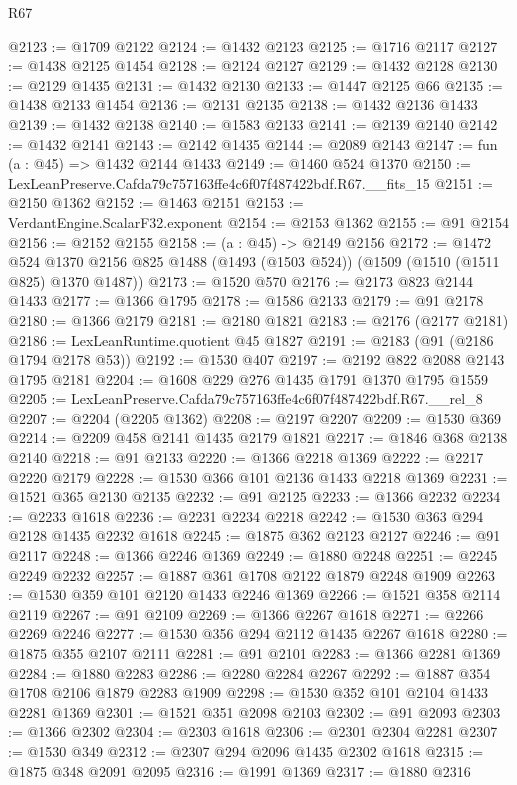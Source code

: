 \begin{lexlean}{R67}
\begin{coremodule}
@2123 := @1709 @2122
@2124 := @1432 @2123
@2125 := @1716 @2117
@2127 := @1438 @2125 @1454
@2128 := @2124 @2127
@2129 := @1432 @2128
@2130 := @2129 @1435
@2131 := @1432 @2130
@2133 := @1447 @2125 @66
@2135 := @1438 @2133 @1454
@2136 := @2131 @2135
@2138 := @1432 @2136 @1433
@2139 := @1432 @2138
@2140 := @1583 @2133
@2141 := @2139 @2140
@2142 := @1432 @2141
@2143 := @2142 @1435
@2144 := @2089 @2143
@2147 := fun (a : @45) => @1432 @2144 @1433
@2149 := @1460 @524 @1370
@2150 := LexLeanPreserve.Cafda79c757163ffe4c6f07f487422bdf.R67.__fits_15
@2151 := @2150 @1362
@2152 := @1463 @2151
@2153 := VerdantEngine.ScalarF32.exponent
@2154 := @2153 @1362
@2155 := @91 @2154
@2156 := @2152 @2155
@2158 := (a : @45) -> @2149 @2156
@2172 := @1472
    @524
    @1370
    @2156
    @825
    @1488
    (@1493 (@1503 @524))
    (@1509 (@1510 (@1511 @825) @1370 @1487))
@2173 := @1520 @570
@2176 := @2173 @823 @2144 @1433
@2177 := @1366 @1795
@2178 := @1586 @2133
@2179 := @91 @2178
@2180 := @1366 @2179
@2181 := @2180 @1821
@2183 := @2176 (@2177 @2181)
@2186 := LexLeanRuntime.quotient @45 @1827
@2191 := @2183 (@91 (@2186 @1794 @2178 @53))
@2192 := @1530 @407
@2197 := @2192 @822 @2088 @2143 @1795 @2181
@2204 := @1608 @229 @276 @1435 @1791 @1370 @1795 @1559
@2205 := LexLeanPreserve.Cafda79c757163ffe4c6f07f487422bdf.R67.__rel_8
@2207 := @2204 (@2205 @1362)
@2208 := @2197 @2207
@2209 := @1530 @369
@2214 := @2209 @458 @2141 @1435 @2179 @1821
@2217 := @1846 @368 @2138 @2140
@2218 := @91 @2133
@2220 := @1366 @2218 @1369
@2222 := @2217 @2220 @2179
@2228 := @1530 @366 @101 @2136 @1433 @2218 @1369
@2231 := @1521 @365 @2130 @2135
@2232 := @91 @2125
@2233 := @1366 @2232
@2234 := @2233 @1618
@2236 := @2231 @2234 @2218
@2242 := @1530 @363 @294 @2128 @1435 @2232 @1618
@2245 := @1875 @362 @2123 @2127
@2246 := @91 @2117
@2248 := @1366 @2246 @1369
@2249 := @1880 @2248
@2251 := @2245 @2249 @2232
@2257 := @1887 @361 @1708 @2122 @1879 @2248 @1909
@2263 := @1530 @359 @101 @2120 @1433 @2246 @1369
@2266 := @1521 @358 @2114 @2119
@2267 := @91 @2109
@2269 := @1366 @2267 @1618
@2271 := @2266 @2269 @2246
@2277 := @1530 @356 @294 @2112 @1435 @2267 @1618
@2280 := @1875 @355 @2107 @2111
@2281 := @91 @2101
@2283 := @1366 @2281 @1369
@2284 := @1880 @2283
@2286 := @2280 @2284 @2267
@2292 := @1887 @354 @1708 @2106 @1879 @2283 @1909
@2298 := @1530 @352 @101 @2104 @1433 @2281 @1369
@2301 := @1521 @351 @2098 @2103
@2302 := @91 @2093
@2303 := @1366 @2302
@2304 := @2303 @1618
@2306 := @2301 @2304 @2281
@2307 := @1530 @349
@2312 := @2307 @294 @2096 @1435 @2302 @1618
@2315 := @1875 @348 @2091 @2095
@2316 := @1991 @1369
@2317 := @1880 @2316

\end{coremodule}
\end{lexlean}
